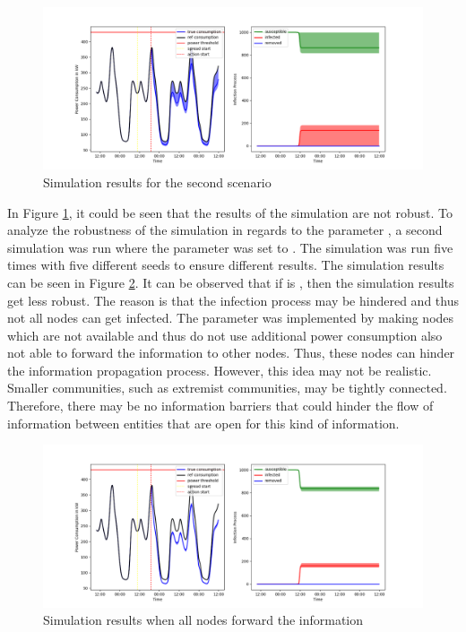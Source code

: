 \begin{figure}[!ht]
    \center
    \includegraphics[scale=.55]{figs/eval/scenario2/basicplot.png}
    \caption{Simulation results for the second scenario}
    \label{schwurblerresults}
\end{figure}

In Figure \ref{schwurblerresults}, it could be seen that 
the results of the simulation are not robust. To analyze the 
robustness of the simulation in regards to the parameter
, a second simulation was run where the 
 parameter was set to . 
The simulation was run five times with five different seeds
to ensure different results. The simulation results can be
seen in Figure \ref{schwurblerresults2}. It
can be observed that if  is , then 
the simulation results get less robust. The reason is 
that the infection process may be hindered and thus not
all nodes can get infected. The  parameter was 
implemented by making nodes which are not available and thus
do not use additional power consumption
also not able to forward the information to other nodes.
Thus, these nodes can hinder the information propagation process.
However, this idea may not be realistic. Smaller communities,
such as extremist communities, may 
be tightly connected. Therefore, there may be no information 
barriers that could hinder the flow of information between 
entities that are open for this kind of information.



\begin{figure}[!ht]
    \center
    \includegraphics[scale=.55]{figs/eval/scenario2/fringeoff.png}
    \caption{Simulation results when all nodes forward the information}
    \label{schwurblerresults2}
\end{figure}


